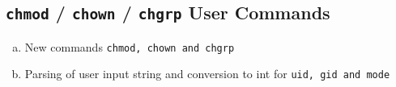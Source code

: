 \documentclass[11pt,letterpaper]{report}
\begin{document}
                                                                                                                                                                                                                                                                                                                                                                                                                                                      \subsection*{{\tt chmod} / {\tt chown} / {\tt chgrp} User Commands}
                                                                                                                                                                                                                                                                                                                                                                                                                                                        \begin{enumerate}[(a)]
                                                                                                                                                                                                                                                                                                                                                                                                                                                              \item New commands {\tt chmod, chown and chgrp}
                                                                                                                                                                                                                                                                                                                                                                                                                                                                    \item Parsing of user input string and conversion to int for {\tt uid, gid and mode}
                                                                                                                                                                                                                                                                                                                                                                                                                                                                      \end{enumerate} 
                                                                                                                                                                                                                                                                                                                                                                                                                                                                        
\end{document}

